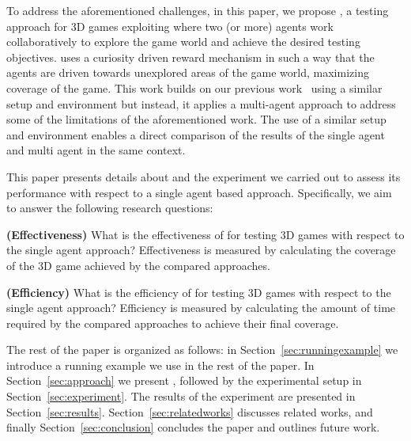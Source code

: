 To address the aforementioned challenges, in this paper, we propose \approach, a testing approach for 3D games  exploiting \marlacronym where two (or more) agents work collaboratively to explore the game world and achieve the desired testing objectives. \approach uses a curiosity driven reward mechanism in such a way that the agents are driven towards unexplored areas of the game world, maximizing coverage of the game. This work builds on our previous work~\cite{DBLP:conf/kbse/FerdousKPS22} using a similar setup and environment but instead, it applies a multi-agent \rlacronym approach to address some of the limitations of the aforementioned work. The use of a similar setup and environment enables a direct comparison of the results of the single agent and multi agent \rlacronym in the same context.


This paper presents details about \approach and the experiment we carried out to assess its performance with respect to a single agent \rlacronym based approach. %
Specifically, we aim to answer the following research questions:

\noindent 
\textbf{\rqa (Effectiveness)} What is  the effectiveness of \approach for testing 3D games with respect to the single agent \rlacronym approach? Effectiveness is measured by calculating the coverage of the 3D game achieved by the compared approaches.

\noindent
\textbf{\rqb (Efficiency)} What is  the efficiency of \approach for testing 3D games with respect to the single agent \rlacronym approach? Efficiency is measured by calculating the amount of time required by the compared approaches to achieve their final coverage. %

The rest of the paper is organized as follows: in Section~\ref{sec:runningexample} we introduce a running example we use in the rest of the paper. In Section~\ref{sec:approach} we present \approach, followed by the experimental setup in Section~\ref{sec:experiment}. The results of the experiment are presented in  Section~\ref{sec:results}. Section~\ref{sec:relatedworks} discusses related works, and finally Section~\ref{sec:conclusion} concludes the paper and outlines future work.
